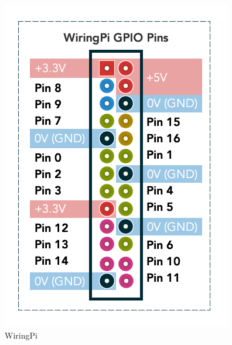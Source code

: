 \begin{figure}[h]
  \centering
  \begin{minipage}[b]{0.4\textwidth}
    \includegraphics[width=\textwidth]{wiringpi.png}
    \caption{WiringPi}
  \end{minipage}
  \hfill
  \begin{minipage}[b]{0.4\textwidth}

\end{minipage}
\end{figure}
